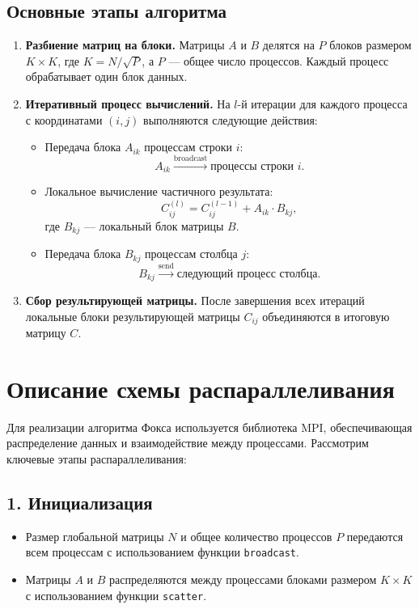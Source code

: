 \documentclass{report}
\begin{document}
\subsection*{Основные этапы алгоритма}
\begin{enumerate}
	\item \textbf{Разбиение матриц на блоки.}  
	Матрицы $A$ и $B$ делятся на $P$ блоков размером $K \times K$, где $K = N / \sqrt{P}$, а $P$ — общее число процессов. Каждый процесс обрабатывает один блок данных.
	
	\item \textbf{Итеративный процесс вычислений.}  
	На $l$-й итерации для каждого процесса с координатами $(i, j)$ выполняются следующие действия:
	\begin{itemize}
		\item Передача блока $A_{ik}$ процессам строки $i$:
		\[
		A_{ik} \xrightarrow{\text{broadcast}} \text{процессы строки } i.
		\]
		\item Локальное вычисление частичного результата:
		\[
		C_{ij}^{(l)} = C_{ij}^{(l-1)} + A_{ik} \cdot B_{kj},
		\]
		где $B_{kj}$ — локальный блок матрицы $B$.
		\item Передача блока $B_{kj}$ процессам столбца $j$:
		\[
		B_{kj} \xrightarrow{\text{send}} \text{следующий процесс столбца}.
		\]
	\end{itemize}
	
	\item \textbf{Сбор результирующей матрицы.}  
	После завершения всех итераций локальные блоки результирующей матрицы $C_{ij}$ объединяются в итоговую матрицу $C$.
\end{enumerate}
\newpage

\section*{Описание схемы распараллеливания}

Для реализации алгоритма Фокса используется библиотека MPI, обеспечивающая распределение данных и взаимодействие между процессами. Рассмотрим ключевые этапы распараллеливания:

\subsection*{1. Инициализация}
\begin{itemize}
	\item Размер глобальной матрицы $N$ и общее количество процессов $P$ передаются всем процессам с использованием функции \texttt{broadcast}.
	\item Матрицы $A$ и $B$ распределяются между процессами блоками размером $K \times K$ с использованием функции \texttt{scatter}.
\end{itemize}
\end{document}
